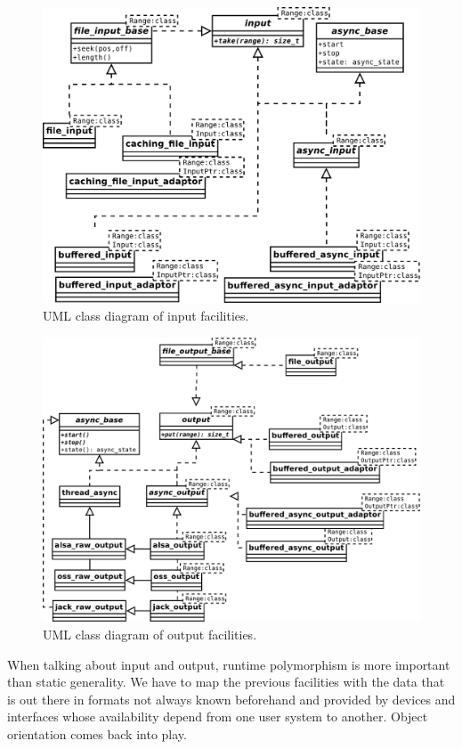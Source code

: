 \begin{figure}[h]
  \centering
  \includegraphics[width=\textwidth]{pic/io-class-input.pdf}
  \caption{UML class diagram of  input facilities.}
  \label{fig:inputuml}
\end{figure}

\begin{figure}[h]
  \centering
  \includegraphics[width=\textwidth]{pic/io-class-output.pdf}
  \caption{UML class diagram of  output facilities.}
  \label{fig:outputuml}
\end{figure}

When talking about input and output, runtime polymorphism is more
important than static generality. We have to map the previous
facilities with the data that is out there in formats not always known
beforehand and provided by devices and interfaces whose availability
depend from one user system to another. Object orientation comes back
into play.


